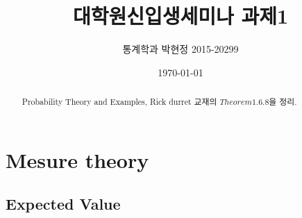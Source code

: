 \documentclass[10pt]{article}
\begin{document}

\title{대학원신입생세미나 과제1}

\author{통계학과 박현정 2015-20299} \date{\today}

\maketitle

\begin{abstract}
Probability Theory and Examples, Rick durret 교재의 $Theorem 1.6.8$을 정리. 
\end{abstract}

\section{Mesure theory}
\subsection{Expected Value} 
\end{document}
